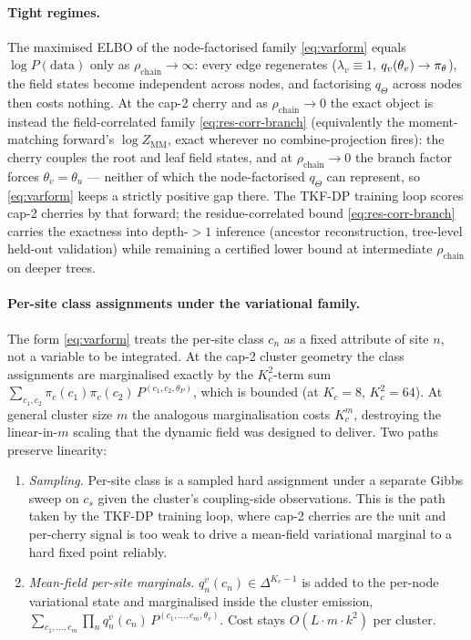 \paragraph{Tight regimes.} The maximised ELBO of the node-factorised
family \eqref{eq:varform} equals $\log P(\text{data})$ only as
$\rho_{\mathrm{chain}}\!\to\!\infty$: every edge regenerates
($\lambda_v\equiv 1$, $q_v(\theta_v)\to\pi_\theta$), the field states become
independent across nodes, and factorising $q_\Theta$ across nodes then costs
nothing. At the cap-2 cherry and as $\rho_{\mathrm{chain}}\!\to\!0$ the exact
object is instead the field-correlated family \eqref{eq:res-corr-branch}
(equivalently the moment-matching forward's $\log Z_{\mathrm{MM}}$, exact
wherever no combine-projection fires): the cherry couples the root and leaf
field states, and at $\rho_{\mathrm{chain}}\!\to\!0$ the branch factor forces
$\theta_v=\theta_u$ --- neither of which the node-factorised $q_\Theta$ can
represent, so \eqref{eq:varform} keeps a strictly positive gap there. The
TKF-DP training loop scores cap-2 cherries by that forward; the
residue-correlated bound \eqref{eq:res-corr-branch} carries the exactness into
depth-$>1$ inference (ancestor reconstruction, tree-level held-out validation)
while remaining a certified lower bound at intermediate $\rho_{\mathrm{chain}}$
on deeper trees.

\paragraph{Per-site class assignments under the variational family.}
The form \eqref{eq:varform} treats the per-site class $c_n$ as a
fixed attribute of site $n$, not a variable to be integrated. At
the cap-2 cluster geometry the class assignments are marginalised
exactly by the $K_c^2$-term sum
$\sum_{c_1, c_2} \pi_c(c_1)\pi_c(c_2)\,P^{(c_1, c_2, \theta_P)}$,
which is bounded (at $K_c = 8$, $K_c^2 = 64$). At general cluster
size $m$ the analogous marginalisation costs $K_c^m$, destroying
the linear-in-$m$ scaling that the dynamic field was designed to
deliver. Two paths preserve linearity:
\begin{enumerate}\itemsep0pt
  \item \emph{Sampling.} Per-site class is a sampled hard
        assignment under a separate Gibbs sweep on $c_s$ given
        the cluster's coupling-side observations. This is the
        path taken by the TKF-DP training loop, where cap-2
        cherries are the unit and per-cherry signal is too weak
        to drive a mean-field variational marginal to a hard
        fixed point reliably.
  \item \emph{Mean-field per-site marginals.}
        $q_n^v(c_n) \in \Delta^{K_c-1}$ is added to the per-node
        variational state and marginalised inside the cluster
        emission,
        $\sum_{c_1, \dots, c_m} \prod_n q_n^v(c_n)\,
         P^{(c_1, \dots, c_m, \theta_v)}$.
        Cost stays $O(L\cdot m\cdot k^2)$ per cluster.
\end{enumerate}

